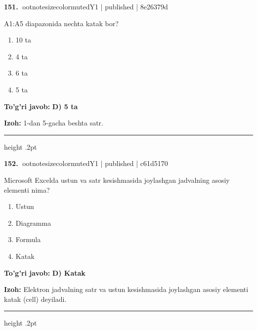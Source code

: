 \documentclass[10pt,a4paper]{article}
\begin{document}
\textbf{\color{ink}151.} {ootnotesizecolor{muted}Y1 | published | 8e26379d}
\par
A1:A5 diapazonida nechta katak bor?
\begin{enumerate}[label=\Alph*),leftmargin=9mm]
\item 10 ta
\item 4 ta
\item 6 ta
\item 5 ta
\end{enumerate}
\begin{tcolorbox}[enhanced,breakable,colback=teal!4,colframe=teal!55!black,boxrule=0.45pt,arc=1.2mm,left=2.8mm,right=2.8mm,top=2mm,bottom=2mm]
\textbf{\color{teal}To'g'ri javob:} \textbf{D) 5 ta}
\par\smallskip
\textbf{Izoh:} 1-dan 5-gacha beshta satr.
\end{tcolorbox}
\vspace{2mm}\hrule height .2pt\vspace{2mm}

\textbf{\color{ink}152.} {ootnotesizecolor{muted}Y1 | published | c61d5170}
\par
Microsoft Excelda ustun va satr kesishmasida joylashgan jadvalning asosiy elementi nima?
\begin{enumerate}[label=\Alph*),leftmargin=9mm]
\item Ustun
\item Diagramma
\item Formula
\item Katak
\end{enumerate}
\begin{tcolorbox}[enhanced,breakable,colback=teal!4,colframe=teal!55!black,boxrule=0.45pt,arc=1.2mm,left=2.8mm,right=2.8mm,top=2mm,bottom=2mm]
\textbf{\color{teal}To'g'ri javob:} \textbf{D) Katak}
\par\smallskip
\textbf{Izoh:} Elektron jadvalning satr va ustun kesishmasida joylashgan asosiy elementi katak (cell) deyiladi.
\end{tcolorbox}
\vspace{2mm}\hrule height .2pt\vspace{2mm}
\end{document}
